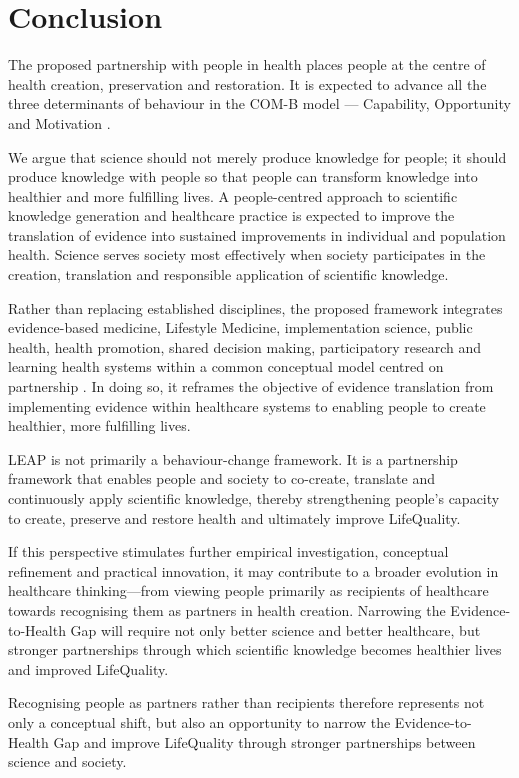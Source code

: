\documentclass{article}
\begin{document}
\section{Conclusion}
\label{sec:org354acea}

The proposed partnership with people in health places people at the centre of health creation, preservation and restoration. It is expected to advance all the three determinants of behaviour in the COM-B model — Capability, Opportunity and Motivation \cite{Michie2011}.

We argue that science should not merely produce knowledge for people; it should produce knowledge with people so that people can transform knowledge into healthier and more fulfilling lives. A people-centred approach to scientific knowledge generation and healthcare practice is expected to improve the translation of evidence into sustained improvements in individual and population health. Science serves society most effectively when society participates in the creation, translation and responsible application of scientific knowledge. 

Rather than replacing established disciplines, the proposed framework integrates evidence-based medicine, Lifestyle Medicine, implementation science, public health, health promotion, shared decision making, participatory research and learning health systems within a common conceptual model centred on partnership \cite{Sackett1996} \cite{Eccles2006} \cite{WHO1986} \cite{Elwyn2012} \cite{IOM2013}. In doing so, it reframes the objective of evidence translation from implementing evidence within healthcare systems to enabling people to create healthier, more fulfilling lives.

LEAP is not primarily a behaviour-change framework. It is a partnership framework that enables people and society to co-create, translate and continuously apply scientific knowledge, thereby strengthening people's capacity to create, preserve and restore health and ultimately improve LifeQuality.

If this perspective stimulates further empirical investigation, conceptual refinement and practical innovation, it may contribute to a broader evolution in healthcare thinking—from viewing people primarily as recipients of healthcare towards recognising them as partners in health creation. Narrowing the Evidence-to-Health Gap will require not only better science and better healthcare, but stronger partnerships through which scientific knowledge becomes healthier lives and improved LifeQuality.

Recognising people as partners rather than recipients therefore represents not only a conceptual shift, but also an opportunity to narrow the Evidence-to-Health Gap and improve LifeQuality through stronger partnerships between science and society.






\end{document}
